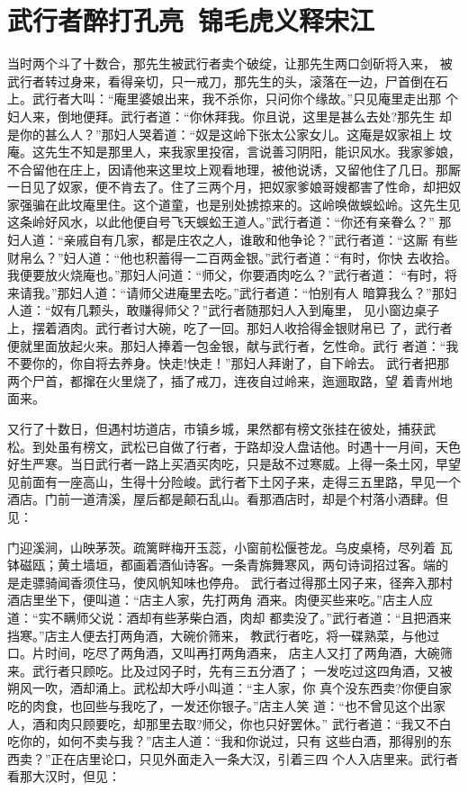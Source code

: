 \chapter{武行者醉打孔亮~锦毛虎义释宋江}

当时两个斗了十数合，那先生被武行者卖个破绽，让那先生两口剑斫将入来，
被武行者转过身来，看得亲切，只一戒刀，那先生的头，滚落在一边，尸首倒在石
上。武行者大叫：“庵里婆娘出来，我不杀你，只问你个缘故。”只见庵里走出那
个妇人来，倒地便拜。武行者道：“你休拜我。你且说，这里是甚么去处?那先生
却是你的甚么人？”那妇人哭着道：“奴是这岭下张太公家女儿。这庵是奴家祖上
坟庵。这先生不知是那里人，来我家里投宿，言说善习阴阳，能识风水。我家爹娘，
不合留他在庄上，因请他来这里坟上观看地理，被他说诱，又留他住了几日。那厮
一日见了奴家，便不肯去了。住了三两个月，把奴家爹娘哥嫂都害了性命，却把奴
家强骗在此坟庵里住。这个道童，也是别处掳掠来的。这岭唤做蜈蚣岭。这先生见
这条岭好风水，以此他便自号飞天蜈蚣王道人。”武行者道：“你还有亲眷么？”
那妇人道：“亲戚自有几家，都是庄农之人，谁敢和他争论？”武行者道：“这厮
有些财帛么？”妇人道：“他也积蓄得一二百两金银。”武行者道：“有时，你快
去收拾。我便要放火烧庵也。”那妇人问道：“师父，你要酒肉吃么？”武行者道：
“有时，将来请我。”那妇人道：“请师父进庵里去吃。”武行者道：“怕别有人
暗算我么？”那妇人道：“奴有几颗头，敢赚得师父？”武行者随那妇人入到庵里，
见小窗边桌子上，摆着酒肉。武行者讨大碗，吃了一回。那妇人收拾得金银财帛已
了，武行者便就里面放起火来。那妇人捧着一包金银，献与武行者，乞性命。武行
者道：“我不要你的，你自将去养身。快走!快走！”那妇人拜谢了，自下岭去。
武行者把那两个尸首，都撺在火里烧了，插了戒刀，连夜自过岭来，迤逦取路，望
着青州地面来。

又行了十数日，但遇村坊道店，市镇乡城，果然都有榜文张挂在彼处，捕获武
松。到处虽有榜文，武松已自做了行者，于路却没人盘诘他。时遇十一月间，天色
好生严寒。当日武行者一路上买酒买肉吃，只是敌不过寒威。上得一条土冈，早望
见前面有一座高山，生得十分险峻。武行者下土冈子来，走得三五里路，早见一个
酒店。门前一道清溪，屋后都是颠石乱山。看那酒店时，却是个村落小酒肆。但见：

门迎溪涧，山映茅茨。疏篱畔梅开玉蕊，小窗前松偃苍龙。乌皮桌椅，尽列着
瓦钵磁瓯；黄土墙垣，都画着酒仙诗客。一条青旆舞寒风，两句诗词招过客。端的
是走骠骑闻香须住马，使风帆知味也停舟。
武行者过得那土冈子来，径奔入那村酒店里坐下，便叫道：“店主人家，先打两角
酒来。肉便买些来吃。”店主人应道：“实不瞒师父说：酒却有些茅柴白酒，肉却
都卖没了。”武行者道：“且把酒来挡寒。”店主人便去打两角酒，大碗价筛来，
教武行者吃，将一碟熟菜，与他过口。片时间，吃尽了两角酒，又叫再打两角酒来，
店主人又打了两角酒，大碗筛来。武行者只顾吃。比及过冈子时，先有三五分酒了；
一发吃过这四角酒，又被朔风一吹，酒却涌上。武松却大呼小叫道：“主人家，你
真个没东西卖?你便自家吃的肉食，也回些与我吃了，一发还你银子。”店主人笑
道：“也不曾见这个出家人，酒和肉只顾要吃，却那里去取?师父，你也只好罢休。”
武行者道：“我又不白吃你的，如何不卖与我？”店主人道：“我和你说过，只有
这些白酒，那得别的东西卖？”正在店里论口，只见外面走入一条大汉，引着三四
个人入店里来。武行者看那大汉时，但见：

